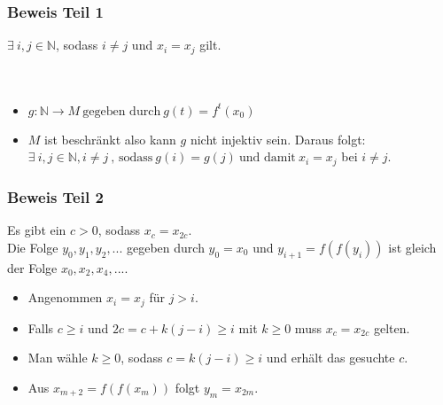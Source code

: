 \documentclass[mathserif, compress, german]{beamer}
\begin{document}
\begin{frame}
  \frametitle{Beweis Teil 1}
$\exists \ i,j \in \mathbb{N}$, sodass $i \not= j$ und $x_i = x_j$ gilt.\\
\ \\
\ \\
  \begin{itemize}
    \item<2->  $g:\mathbb{N} \rightarrow M \ \text{gegeben durch} \ g(t)=f^t(x_0)$
      \vspace{3mm}
    \item<3-> $M$ ist beschr\"ankt also kann $g$ nicht injektiv sein. Daraus folgt:\\
	      $\exists \ i,j \in \mathbb{N}, i\not=j \ \text{, sodass} \ g(i)=g(j) \ \text{und damit} \ x_i=x_j$ bei $i\not=j$.
  \end{itemize}
\end{frame}

\begin{frame}
  \frametitle{Beweis Teil 2}
Es gibt ein $c>0$, sodass $x_c=x_{2c}$.\\ 
Die Folge $y_0, y_1, y_2,...$ gegeben durch $y_0=x_0$ und $y_{i+1}=f(f(y_i))$ ist gleich der Folge $x_0,x_2,x_4,...$.
  \begin{itemize}
    \item<2-> Angenommen $x_i=x_j$ f\"ur $j>i$.
     \vspace{3mm}
    \item<3-> Falls $c\geq i$ und $2c=c+k(j-i)\geq i$ mit $k\geq 0$ muss $x_c=x_{2c}$ gelten.
     \vspace{3mm}
    \item<4-> Man w\"ahle $k\geq 0$, sodass $c=k(j-i)\geq i$ und erh\"alt das gesuchte $c$.
     \vspace{3mm}
    \item<5-> Aus $x_{m+2}=f(f(x_m))$ folgt $y_m = x_{2m}$.
  \end{itemize}
\end{frame}
\end{document}
